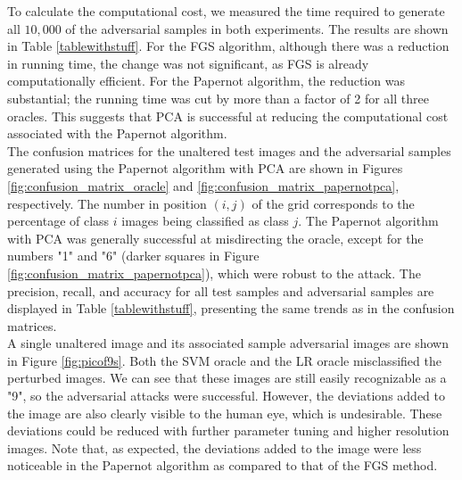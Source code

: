 \indent To calculate the computational cost, we measured the time required to generate all $10,000$ of the adversarial samples in both experiments. The results are shown in Table \ref{tablewithstuff}. For the FGS algorithm, although there was a reduction in running time, the change was not significant, as FGS is already computationally efficient. For the Papernot algorithm, the reduction was substantial; the running time was cut by more than a factor of 2 for all three oracles. This suggests that PCA is successful at reducing the computational cost associated with the Papernot algorithm.\\
\indent The confusion matrices for the unaltered test images and the adversarial samples generated using the Papernot algorithm with PCA are shown in Figures \ref{fig:confusion_matrix_oracle} and \ref{fig:confusion_matrix_papernotpca}, respectively. The number in position $(i, j)$ of the grid corresponds to the percentage of class $i$ images being classified as class $j$. The Papernot algorithm with PCA was generally successful at misdirecting the oracle, except for the numbers "1" and "6" (darker squares in Figure \ref{fig:confusion_matrix_papernotpca}), which were robust to the attack. The precision, recall, and accuracy for all test samples and adversarial samples are displayed in Table \ref{tablewithstuff}, presenting the same trends as in the confusion matrices.\\
\indent A single unaltered image and its associated sample adversarial images are shown in Figure \ref{fig:picof9s}. Both the SVM oracle and the LR oracle misclassified the perturbed images. We can see that these images are still easily recognizable as a "9", so the adversarial attacks were successful. However, the deviations added to the image are also clearly visible to the human eye, which is undesirable. These deviations could be reduced with further parameter tuning and higher resolution images. Note that, as expected, the deviations added to the image were less noticeable in the Papernot algorithm as compared to that of the FGS method. 



